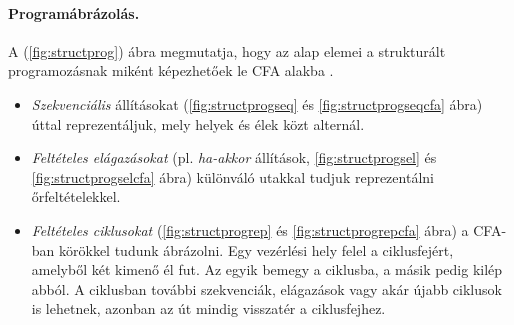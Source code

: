 \paragraph{Programábrázolás.} A (\ref{fig:structprog}) ábra megmutatja, hogy az alap elemei a strukturált programozásnak miként képezhetőek le CFA alakba \cite{soft_ver_akos}.
\begin{itemize}
	\item \emph{Szekvenciális} állításokat (\ref{fig:structprogseq} és \ref{fig:structprogseqcfa} ábra) úttal reprezentáljuk, mely helyek és élek közt alternál.
	
	\item \emph{Feltételes elágazásokat} (pl. \textit{ha-akkor} állítások, \ref{fig:structprogsel} és \ref{fig:structprogselcfa} ábra) különváló utakkal tudjuk reprezentálni őrfeltételekkel.
	
	\item \emph{Feltételes ciklusokat} (\ref{fig:structprogrep} és \ref{fig:structprogrepcfa} ábra) a CFA-ban körökkel tudunk ábrázolni. Egy vezérlési hely felel a ciklusfejért, amelyből két kimenő él fut. Az egyik bemegy a ciklusba, a másik pedig kilép abból. A ciklusban további szekvenciák, elágazások vagy akár újabb ciklusok is lehetnek, azonban az út mindig visszatér a ciklusfejhez.
\end{itemize}
